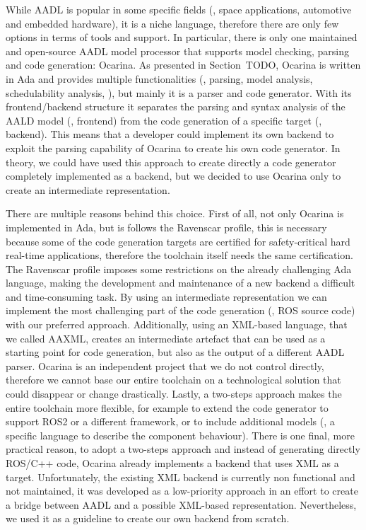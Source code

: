While AADL is popular in some specific fields (\eg, space applications, automotive and embedded hardware), it is a niche language, therefore there are only few options in terms of tools and support. In particular, there is only one maintained and open-source AADL model processor that supports model checking, parsing and code generation: Ocarina. As presented in Section~TODO, Ocarina is written in Ada and provides multiple functionalities (\eg, parsing, model analysis, schedulability analysis, \etc), but mainly it is a parser and code generator. With its frontend/backend structure it separates the parsing and syntax analysis of the AALD model (\ie, frontend) from the code generation of a specific target (\ie, backend). This means that a developer could implement its own backend to exploit the parsing capability of Ocarina to create his own code generator. In theory, we could have used this approach to create directly a code generator completely implemented as a backend, but we decided to use Ocarina only to create an intermediate representation.

There are multiple reasons behind this choice. First of all, not only Ocarina is implemented in Ada, but is follows the Ravenscar profile, this is necessary because some of the code generation targets are certified for safety-critical hard real-time applications, therefore the toolchain itself needs the same certification. The Ravenscar profile imposes some restrictions on the already challenging Ada language, making the development and maintenance of a new backend a difficult and time-consuming task. By using an intermediate representation we can implement the most challenging part of the code generation (\ie, ROS source code) with our preferred approach. Additionally, using an XML-based language, that we called AAXML, creates an intermediate artefact that can be used as a starting point for code generation, but also as the output of a different AADL parser. Ocarina is an independent project that we do not control directly, therefore we cannot base our entire toolchain on a technological solution that could disappear or change drastically. Lastly, a two-steps approach makes the entire toolchain more flexible, for example to extend the code generator to support ROS2 or a different framework, or to include additional models (\eg, a specific language to describe the component behaviour). There is one final, more practical reason, to adopt a two-steps approach and instead of generating directly ROS/C++ code, Ocarina already implements a backend that uses XML as a target. Unfortunately, the existing XML backend is currently non functional and not maintained, it was developed as a low-priority approach in an effort to create a bridge between AADL and a possible XML-based representation. Nevertheless, we used it as a guideline to create our own backend from scratch.

